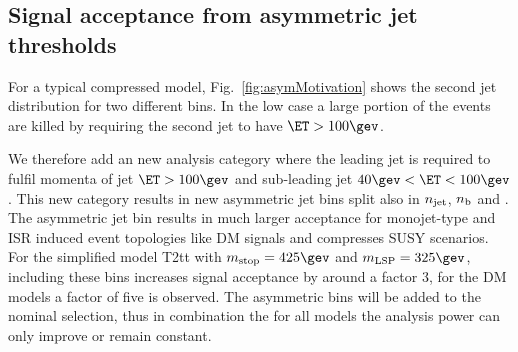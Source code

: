 \begin{table}[h]
\begin{tabular}
\hline\hline
  \end{tabular}
\end{table}

\newpage
\subsection{Signal acceptance from asymmetric jet \Pt thresholds}

For a typical compressed model, Fig.~\ref{fig:asymMotivation} shows the second jet \PT
distribution for two different \HT bins. In the low \HT case a large portion of
the events are killed by requiring the second jet to have $\ET>100\gev$. 

We therefore add an new analysis category where the leading jet is required to fulfil 
momenta of jet $\ET>100\gev$ and sub-leading jet $40\gev<\ET<100\gev$. This new category 
results in new asymmetric jet bins split also in $\njet$, $\nb$ and \HT. The asymmetric jet bin
results in much larger acceptance for monojet-type and ISR induced event topologies like DM signals
and compresses SUSY scenarios. 
For the simplified model T2tt with $m_{\rm stop}=425\gev$ and $m_{\rm LSP}=325\gev$, 
including these bins increases signal acceptance by around a factor 3, for the DM models a factor of five is observed.
The asymmetric bins will be added to the nominal selection, thus in combination the for all models the analysis power can only improve or remain constant.

